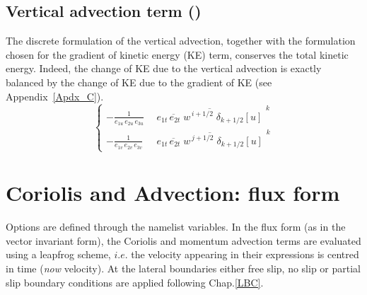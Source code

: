 \subsection   [Vertical advection term (\textit{dynzad}) ]
			{Vertical advection term () }
\label{DYN_zad}

The discrete formulation of the vertical advection, together with the formulation 
chosen for the gradient of kinetic energy (KE) term, conserves the total kinetic 
energy. Indeed, the change of KE due to the vertical advection is exactly 
balanced by the change of KE due to the gradient of KE (see Appendix~\ref{Apdx_C}).
\begin{equation} \label{Eq_dynzad}
\left\{ 		\begin{aligned}
-\frac{1} {e_{1u}\,e_{2u}\,e_{3u}} &\ \overline{\ \overline{ e_{1t}\,e_{2t}\;w } ^{\,i+1/2}  \;\delta _{k+1/2} \left[ u \right]\  }^{\,k}  \\
-\frac{1} {e_{1v}\,e_{2v}\,e_{3v}}  &\ \overline{\ \overline{ e_{1t}\,e_{2t}\;w } ^{\,j+1/2}  \;\delta _{k+1/2} \left[ u \right]\  }^{\,k} 
\end{aligned}         \right.
\end{equation} 

\section{Coriolis and Advection: flux form}
\label{DYN_adv_cor_flux}

Options are defined through the  namelist variables.
In the flux form (as in the vector invariant form), the Coriolis and momentum 
advection terms are evaluated using a leapfrog scheme, $i.e.$ the velocity 
appearing in their expressions is centred in time (\textit{now} velocity). At the 
lateral boundaries either free slip, no slip or partial slip boundary conditions 
are applied following Chap.\ref{LBC}.


